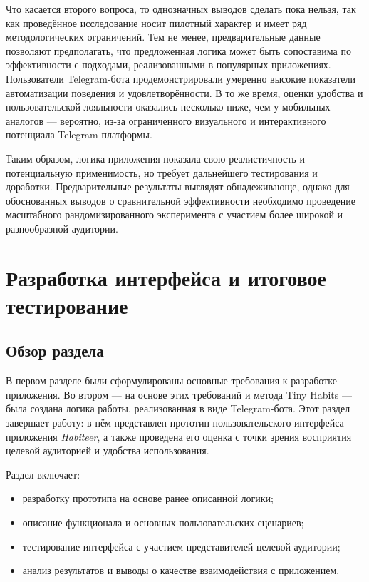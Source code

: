 \documentclass[pdflatex,sn-mathphys-num]{sn-jnl}%
\theoremstyle{thmstyleone}%
\theoremstyle{thmstyletwo}%
\theoremstyle{thmstylethree}%
\begin{document}
Что касается второго вопроса, то однозначных выводов сделать пока нельзя, так как проведённое исследование носит пилотный характер и имеет ряд методологических ограничений. Тем не менее, предварительные данные позволяют предполагать, что предложенная логика может быть сопоставима по эффективности с подходами, реализованными в популярных приложениях. Пользователи Telegram-бота продемонстрировали умеренно высокие показатели автоматизации поведения и удовлетворённости. В то же время, оценки удобства и пользовательской лояльности оказались несколько ниже, чем у мобильных аналогов — вероятно, из-за ограниченного визуального и интерактивного потенциала Telegram-платформы.

Таким образом, логика приложения показала свою реалистичность и потенциальную применимость, но требует дальнейшего тестирования и доработки. Предварительные результаты выглядят обнадеживающе, однако для обоснованных выводов о сравнительной эффективности необходимо проведение масштабного рандомизированного эксперимента с участием более широкой и разнообразной аудитории.

\newpage

\section{Разработка интерфейса и итоговое тестирование}

\subsection{Обзор раздела}

В первом разделе были сформулированы основные требования к разработке приложения. Во втором — на основе этих требований и метода Tiny Habits — была создана логика работы, реализованная в виде Telegram-бота. Этот раздел завершает работу: в нём представлен прототип пользовательского интерфейса приложения \textit{Habiteer}, а также проведена его оценка с точки зрения восприятия целевой аудиторией и удобства использования.

Раздел включает:
\begin{itemize}
    \item разработку прототипа на основе ранее описанной логики;
    \item описание функционала и основных пользовательских сценариев;
    \item тестирование интерфейса с участием представителей целевой аудитории;
    \item анализ результатов и выводы о качестве взаимодействия с приложением.
\end{itemize}
\end{document}
